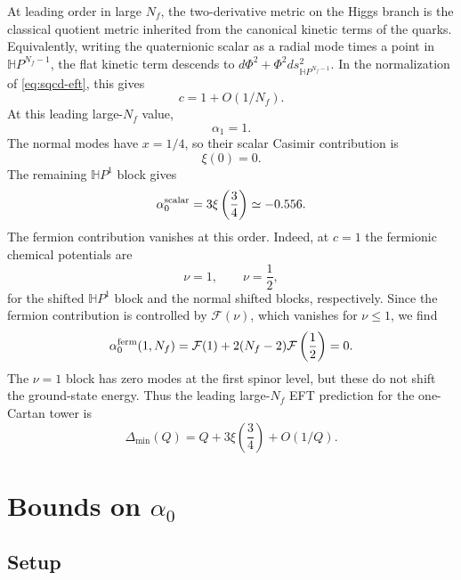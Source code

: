 \documentclass[a4paper,11pt]{article}
\newcommand\Dm{\Delta_{\min}}
\begin{document}
At leading order in large $N_f$, the two-derivative metric on the Higgs branch is the classical quotient metric inherited from the canonical kinetic terms of the quarks. Equivalently, writing the quaternionic scalar as a radial
mode times a point in $\mathbb HP^{N_f-1}$, the flat kinetic term descends to $d\Phi^2+\Phi^2 ds^2_{\mathbb HP^{N_f-1}}$. In the normalization of \eqref{eq:sqcd-eft}, this gives
\begin{equation}
  c=1+O(1/N_f).
\end{equation}
At this leading large-$N_f$ value,
\begin{equation}
  \alpha_1=1.
\end{equation}
The normal modes have $x=1/4$, so their scalar Casimir contribution is
\begin{equation}
  \xi(0)=0.
\end{equation}
The remaining $\mathbb HP^1$ block gives
\begin{equation}
  \alpha_0^{\rm scalar} = 3\xi\left(\frac34\right) \simeq -0.556.
\end{equation}
The fermion contribution vanishes at this order. Indeed, at $c=1$ the fermionic chemical potentials are
\begin{equation}
  \nu=1, \qquad \nu=\frac12,
\end{equation}
for the shifted $\mathbb HP^1$ block and the normal shifted blocks, respectively. Since the fermion contribution is controlled by $\mathcal F(\nu)$, which vanishes for $\nu\leq1$, we find
\begin{equation}
  \alpha_0^{\rm ferm}(1,N_f) = \mathcal F(1) + 2(N_f-2)\mathcal F\left(\frac12\right) = 0.
\end{equation}
The $\nu=1$ block has zero modes at the first spinor level, but these do not shift the ground-state energy. Thus the leading large-$N_f$ EFT prediction for the one-Cartan tower is
\begin{equation}
  \Dm(Q) = Q + 3\xi\left(\frac34\right) + O(1/Q).
\end{equation}




\section{Bounds on $\alpha_0$}\label{sec:alpha0}
 

\subsection{Setup}\label{subsec:alpha0-setup}
\end{document}
